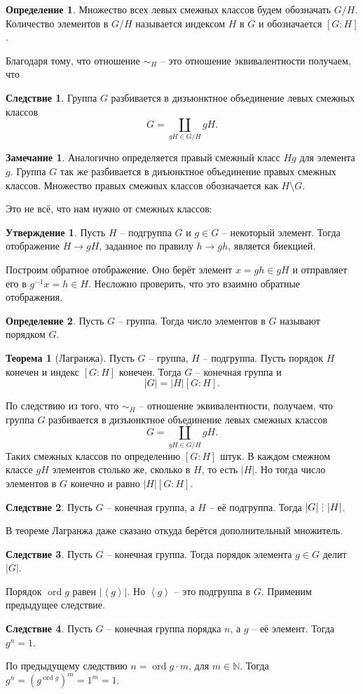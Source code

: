 \documentclass[10pt,a4paper,oneside]{book}
\theoremstyle{definition}
\newtheorem*{rem}{\color{green!50!blue}Замечание}
\newtheorem*{defn}{\color{yellow!30!red} Определение}
\newtheorem{thm}{\color{red!40!black}Теорема}
\newtheorem{cor}{\color{green!45!black}Следствие}
\newtheorem{utvr}{\color{blue!50!black}Утверждение}
\newcommand{\mb}[1]{\mathbb{#1}}
\newcommand{\ord}{\operatorname{ord}}
\newcommand{\di}{\mathop{\,\scalebox{0.85}{\raisebox{-1.2pt}[0.5\height]{\vdots}}\,}}
\def\lan{\left\langle }
\def\ran{\right\rangle}
\def\thrm{\begin{thm}}
\def\ethrm{\end{thm}}
\def\dfn{\begin{defn}}
\def\edfn{\end{defn}}
\def\crl{\begin{cor}}
\def\ecrl{\end{cor}}
\def\rm{\begin{rem}}
\def\erm{\end{rem}}
\def\utv{\begin{utvr}}
\def\eutv{\end{utvr}}
\begin{document}
\dfn Множество всех левых смежных классов будем обозначать $G/H$. Количество элементов в $G/H$ называется индексом $H$ в $G$  и обозначается $[G:H]$. 
\edfn

Благодаря тому, что отношение $\sim_H$ -- это отношение эквивалентности получаем, что



\crl Группа $G$ разбивается в дизъюнктное объединение левых смежных классов $$G=\coprod_{ gH \in G/H} gH.$$
\ecrl




\rm Аналогично определяется правый смежный класс $Hg$ для элемента $g$. Группа $G$ так же разбивается в диъюнктное объединение правых смежных классов. Множество правых смежных классов обозначается как $H\setminus G$.
\erm 

Это не всё, что нам нужно от смежных классов:

\utv Пусть $H$ -- подгруппа $G$ и $g\in G$ -- некоторый элемент. Тогда отображение $H \to gH$, заданное по правилу $h \to gh$, является биекцией.
\eutv
\proof Построим обратное отображение. Оно берёт элемент $x=gh\in gH$ и отправляет его в $g^{-1}x=h \in H $. Несложно проверить, что это взаимно обратные отображения.
\endproof

\dfn Пусть $G$ -- группа. Тогда число элементов в $G$ называют порядком $G$.
\edfn

\thrm[Лагранжа]  Пусть $G$ -- группа, $H$ -- подгруппа. Пусть порядок  $H$ конечен и индекс $[G:H]$ конечен. Тогда $G$ -- конечная группа и 
 $$|G|=|H|[G:H].$$
\ethrm
\proof По следствию из того, что $\sim_H$ -- отношение эквивалентности, получаем, что группа $G$ разбивается в дизъюнктное объединение левых смежных классов $$G=\coprod_{gH \in G/H} gH.$$
Таких смежных классов по определению $[G:H]$ штук. В каждом смежном классе $gH$ элементов столько же, сколько в $H$, то есть $|H|$. Но тогда число элементов в $G$ конечно и равно $|H|[G:H]$.
\endproof

\crl Пусть $G$ -- конечная группа, а $H$ -- её подгруппа. Тогда $|G| \di |H|$.
\ecrl
\proof В теореме Лагранжа даже сказано откуда берётся дополнительный множитель.
\endproof

\crl Пусть $G$ -- конечная группа. Тогда порядок элемента $g\in G$ делит $|G|$.
\ecrl
\proof Порядок $\ord g$ равен $|\lan g\ran|$. Но $\lan g\ran$ -- это подгруппа в $G$. Применим предыдущее следствие.
\endproof

\crl Пусть $G$ -- конечная группа порядка $n$, а $g$ -- её элемент. Тогда $g^n=1$.
\ecrl  
\proof По предыдущему следствию $n= \ord g \cdot m$, для $m\in \mb N$. Тогда $g^n=(g^{\ord g})^m=1^m=1$. 
\endproof
\end{document}
